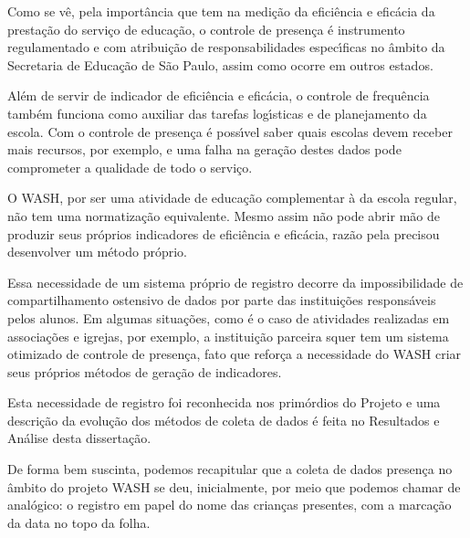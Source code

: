 \documentclass[
12pt,		%
openright,	%
twoside,  %
a4paper,			%
chapter=TITLE,		%
english,			%
french,				%
spanish,			%
brazil				%
]{USPSC-classe/USPSC_RedarTex}
\begin{document}
Como se v\^e, pela import\^ancia que tem na medi\c{c}\~ao da efici\^encia e efic\'acia da presta\c{c}\~ao do servi\c{c}o de educa\c{c}\~ao, o controle de presen\c{c}a \'e instrumento regulamentado e com atribui\c{c}\~ao de responsabilidades espec\'{\i}ficas no \^ambito da Secretaria de Educa\c{c}\~ao de S\~ao Paulo, assim como ocorre em outros estados.








Al\'em de servir de indicador de efici\^encia e efic\'acia, o controle de frequ\^encia tamb\'em funciona como auxiliar das tarefas log\'{\i}sticas e de planejamento da escola. Com o controle de presen\c{c}a \'e poss\'{\i}vel saber quais escolas devem receber mais recursos, por exemplo, e uma falha na gera\c{c}\~ao destes dados pode comprometer a qualidade de todo o servi\c{c}o.








O WASH, por ser uma atividade de educa\c{c}\~ao complementar \`a da escola regular, n\~ao tem uma normatiza\c{c}\~ao equivalente. Mesmo assim n\~ao pode abrir m\~ao de produzir seus pr\'oprios indicadores de efici\^encia e efic\'acia, raz\~ao pela precisou desenvolver um m\'etodo pr\'oprio.








Essa necessidade de um sistema pr\'oprio de registro decorre da impossibilidade de compartilhamento ostensivo de dados por parte das institui\c{c}\~oes respons\'aveis pelos alunos. Em algumas situa\c{c}\~oes, como \'e o caso de atividades realizadas em associa\c{c}\~oes e igrejas, por exemplo, a institui\c{c}\~ao parceira squer tem um sistema otimizado de controle de presen\c{c}a, fato que refor\c{c}a a necessidade do WASH criar seus pr\'oprios m\'etodos de gera\c{c}\~ao de indicadores.








Esta necessidade de registro foi reconhecida nos prim\'ordios do Projeto e uma descri\c{c}\~ao da evolu\c{c}\~ao dos m\'etodos de coleta de dados \'e feita no Resultados e An\'alise desta disserta\c{c}\~ao.








De forma bem suscinta, podemos recapitular que a coleta de dados presen\c{c}a no \^ambito do projeto WASH se deu, inicialmente, por meio que podemos chamar de anal\'ogico: o registro em papel do nome das crian\c{c}as presentes, com a marca\c{c}\~ao da data no topo da folha.
\end{document}
